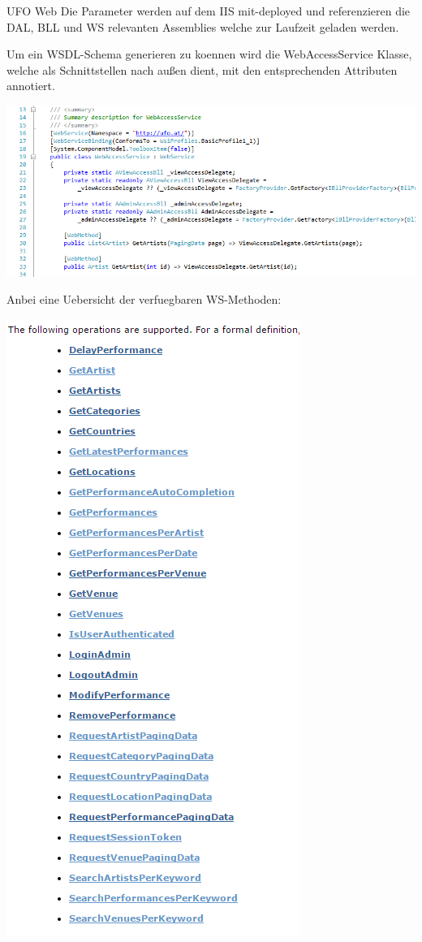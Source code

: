 \begin{section}{UFO Web}
Die Parameter werden auf dem IIS mit-deployed und referenzieren die DAL, BLL und WS relevanten Assemblies welche zur Laufzeit geladen werden. 

Um ein WSDL-Schema generieren zu koennen wird die WebAccessService Klasse, welche als Schnittstellen nach außen dient, mit den entsprechenden Attributen annotiert.

\includegraphics[angle=0, scale=0.45]{./img/3_ausb_webservice.PNG}
\FloatBarrier

Anbei eine Uebersicht der verfuegbaren WS-Methoden:

\includegraphics[angle=0, scale=0.45]{./img/3_ausb_ws_methods.PNG}
\FloatBarrier


\end{section}
